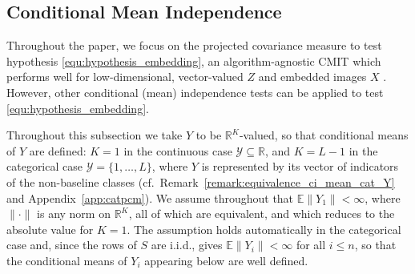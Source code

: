 \documentclass[twoside,11pt]{article}
\begin{document}
\subsection{Conditional Mean Independence}\label{subsec:cond_mean_indep}

Throughout the paper, we focus on the projected covariance measure \citep[PCM;][]{lundborg2024projected} to test hypothesis \eqref{equ:hypothesis_embedding}, an algorithm-agnostic CMIT which performs well for low-dimensional, vector-valued $Z$ and embedded images $X$ \citep{simnacher2026deep}. However, other conditional (mean) independence tests \citep[e.g.,][]{strobl2019approximate, dai2022significance, williamson2023general, cai2025test} can be applied to test \eqref{equ:hypothesis_embedding}. 

Throughout this subsection we take $Y$ to be $\mathbb R^K$-valued, so that conditional means of $Y$ are defined: $K=1$ in the continuous case $\mathcal Y\subseteq\mathbb R$, and $K=L-1$ in the categorical case $\mathcal Y=\{1,\dots,L\}$, where $Y$ is represented by its vector of indicators of the non-baseline classes (cf.\ Remark~\ref{remark:equivalence_ci_mean_cat_Y} and
Appendix~\ref{app:catpcm}). We assume throughout that $\mathbb E\|Y_1\|<\infty$, where $\|\cdot\|$ is any norm on $\mathbb R^K$, all of which are equivalent, and which reduces to the absolute value for $K=1$. The assumption holds automatically in the categorical case and, since the rows of $S$ are i.i.d., gives $\mathbb E\|Y_i\|<\infty$ for all $i\le n$, so that the conditional means of $Y_i$ appearing below are well defined.
\end{document}
